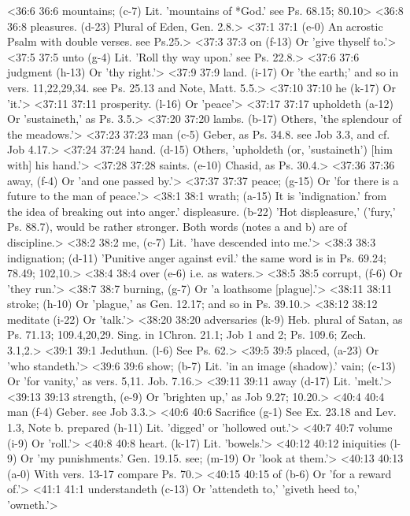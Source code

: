<36:6 36:6  mountains; (c-7)  Lit. 'mountains of *God.' see Ps. 68.15; 80.10>
<36:8 36:8  pleasures. (d-23)  Plural of Eden, Gen. 2.8.>
<37:1 37:1   (e-0)  An acrostic Psalm with double verses. see Ps.25.>
<37:3 37:3  on (f-13)  Or 'give thyself to.'>
<37:5 37:5  unto (g-4)  Lit. 'Roll thy way upon.' see Ps. 22.8.>
<37:6 37:6  judgment (h-13)  Or 'thy right.'>
<37:9 37:9  land. (i-17)  Or 'the earth;' and so in vers. 11,22,29,34. see Ps. 25.13  and Note, Matt. 5.5.>
<37:10 37:10  he (k-17)  Or 'it.'>
<37:11 37:11  prosperity. (l-16)  Or 'peace'>
<37:17 37:17  upholdeth (a-12)  Or 'sustaineth,' as Ps. 3.5.>
<37:20 37:20  lambs. (b-17)  Others, 'the splendour of the meadows.'>
<37:23 37:23  man (c-5)  Geber, as Ps. 34.8. see Job 3.3, and cf. Job 4.17.>
<37:24 37:24  hand. (d-15)  Others, 'upholdeth (or, 'sustaineth') [him with] his hand.'>
<37:28 37:28  saints. (e-10)  Chasid, as Ps. 30.4.>
<37:36 37:36  away, (f-4)  Or 'and one passed by.'>
<37:37 37:37  peace; (g-15)  Or 'for there is a future to the man of peace.'>
<38:1 38:1  wrath; (a-15)  It is 'indignation.' from the idea of breaking out into  anger.'
  displeasure. (b-22)  'Hot displeasure,' ('fury,' Ps. 88.7), would be rather  stronger. Both words (notes a and b) are of discipline.>
<38:2 38:2  me, (c-7)  Lit. 'have descended into me.'>
<38:3 38:3  indignation; (d-11)  'Punitive anger against evil.' the same word is in Ps. 69.24;  78.49; 102,10.>
<38:4 38:4  over (e-6)  i.e. as waters.>
<38:5 38:5  corrupt, (f-6)  Or 'they run.'>
<38:7 38:7  burning, (g-7)  Or 'a loathsome [plague].'>
<38:11 38:11  stroke; (h-10)  Or 'plague,' as Gen. 12.17; and so in Ps. 39.10.>
<38:12 38:12  meditate (i-22)  Or 'talk.'>
<38:20 38:20  adversaries (k-9)  Heb. plural of Satan, as Ps. 71.13; 109.4,20,29. Sing. in 1Chron. 21.1; Job 1 and 2; Ps. 109.6; Zech. 3.1,2.>
<39:1 39:1  Jeduthun. (l-6)  See Ps. 62.>
<39:5 39:5  placed, (a-23)  Or 'who standeth.'>
<39:6 39:6  show; (b-7)  Lit. 'in an image (shadow).'
  vain; (c-13)  Or 'for vanity,' as vers. 5,11. Job. 7.16.>
<39:11 39:11  away (d-17)  Lit. 'melt.'>
<39:13 39:13  strength, (e-9)  Or 'brighten up,' as Job 9.27; 10.20.>
<40:4 40:4  man (f-4)  Geber. see Job 3.3.>
<40:6 40:6  Sacrifice (g-1)  See Ex. 23.18 and Lev. 1.3, Note b.
 prepared (h-11)  Lit. 'digged' or 'hollowed out.'>
<40:7 40:7  volume (i-9)  Or 'roll.'>
<40:8 40:8  heart. (k-17)  Lit. 'bowels.'>
<40:12 40:12  iniquities (l-9)  Or 'my punishments.' Gen. 19.15.
  see; (m-19)  Or 'look at them.'>
<40:13 40:13   (a-0)  With vers. 13-17 compare Ps. 70.>
<40:15 40:15  of (b-6)  Or 'for a reward of.'>
<41:1 41:1  understandeth (c-13)  Or 'attendeth to,' 'giveth heed to,' 'owneth.'>
